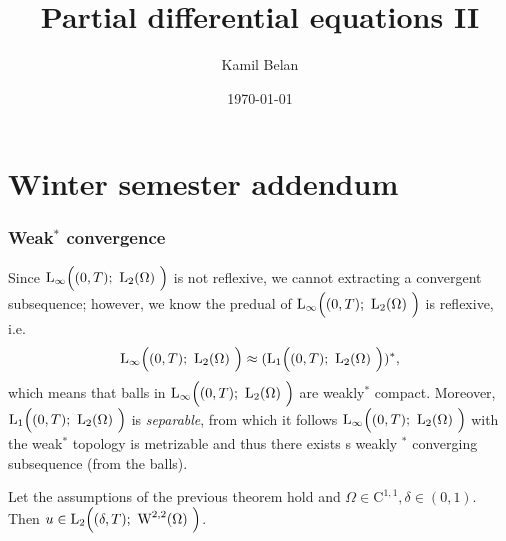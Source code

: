 \documentclass{article}
\title{Partial differential equations II}
\date{\today}
\author{Kamil Belan}
\begin{document}
\begin{comment}
 \begin{abstract}
  Here comes the abstract.
\end{abstract}

\end{comment}

\maketitle
\tableofcontents

\section{Winter semester addendum}
\label{chap:addendum}

\subsubsection{Weak$^*$ convergence}
\label{sec:weakstarconv}
Since $\LinfIntX{0}{T}{\LpSet[2]{\Omega}}$ is not reflexive, we cannot extracting a convergent subsequence; however, we know the predual of $\LinfIntX{0}{T}{\LpSet[2]{\Omega}}$ is reflexive, i.e.
\[
	\LinfIntX{0}{T}{\LpSet[2]{\Omega}} \approx (\LpIntX{1}{0}{T}{\LpSet[2]{\Omega}})^{*},
\]
which means that balls in $\LinfIntX{0}{T}{\LpSet[2]{\Omega}}$ are weakly$^{*}$ compact. Moreover, $\LpIntX{1}{0}{T}{\LpSet[2]{\Omega}}$ is \textit{separable}, from which it follows $\LinfIntX{0}{T}{\LpSet[2]{\Omega}}$ with the weak$^{*}$ topology is metrizable and thus there exists s weakly $^{*}$ converging subsequence (from the balls).

\begin{theorem}
	Let the assumptions of the previous theorem hold and $\Omega \in \text{C}^{1,1}, \delta \in (0,1).$ Then $ u \in \LpIntX{2}{\delta}{T}{\WkpSet[2][2]{\Omega}}$.
\end{theorem}
\end{document}
